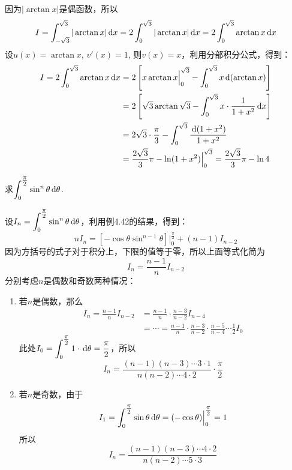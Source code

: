 \begin{solution}
因为$|\arctan x|$是偶函数，所以
\[I=\displaystyle\int^{\sqrt{3}}_{-\sqrt{3}}|\arctan x|\,{\rm d} x=2\displaystyle\int^{\sqrt{3}}_{0}|\arctan x|\,{\rm d} x=2\displaystyle\int^{\sqrt{3}}_{0}\arctan x\,{\rm d} x\]
设$u(x)=\arctan x$, $v'(x)=1$, 则$v(x)=x$，利用分部积分公式，得到：
\[\begin{split}
    I=2\displaystyle\int^{\sqrt{3}}_{0}\arctan x\,{\rm d} x &=2\left[x\arctan x\Big|^{\sqrt{3}}_0-\int^{\sqrt{3}}_0 x\,{\rm d} (\arctan x)\right]\\
    &=2\left[\sqrt{3}\arctan\sqrt{3}-\int^{\sqrt{3}}_0 x\cdot \dfrac{1}{1+x^2}\,{\rm d} x \right]\\
    &=2\sqrt{3}\cdot \dfrac{\pi}{3}-\int^{\sqrt{3}}_0 \dfrac{\,{\rm d}(1+x^2)}{1+x^2}\\
    &=\dfrac{2\sqrt{3}}{3}\pi -\ln(1+x^2)\Big|^{\sqrt{3}}_0= \dfrac{2\sqrt{3}}{3}\pi -\ln 4
\end{split}\]
\end{solution}


\begin{example}
    求$\displaystyle\int^{\tfrac{\pi}{2}}_0 \sin^n \theta\,{\rm d} \theta$.
\end{example}

\begin{solution}
    设$I_n=\displaystyle\int^{\tfrac{\pi}{2}}_0 \sin^n \theta\,{\rm d} \theta$，利用例4.42的结果，得到：
\[nI_n=\left[-\cos\theta\sin^{n-1}\theta\right]\Big|^{\tfrac{\pi}{2}}_0 +(n-1)I_{n-2}\]
因为方括号的式子对于积分上，下限的值等于零，所以上面等式化简为
\[I_n=\frac{n-1}{n}I_{n-2}\]
分别考虑$n$是偶数和奇数两种情况：
\begin{enumerate}
    \item 若$n$是偶数，那么
\[\begin{split}
    I_n=\frac{n-1}{n}I_{n-2}&=\frac{n-1}{n}\cdot \frac{n-3}{n-2}I_{n-4}\\
    &=\cdots=\frac{n-1}{n}\cdot \frac{n-3}{n-2}\cdot \frac{n-5}{n-4}\cdots \frac{1}{2}I_{0}
\end{split}
    \]
此处$I_0=\displaystyle\int^{\tfrac{\pi}{2}}_0 1\cdot \,{\rm d} \theta=\dfrac{\pi}{2}$，所以
\[I_n=\frac{(n-1)(n-3)\cdots 3\cdot 1}{n(n-2)\cdots 4\cdot 2}\cdot \frac{\pi}{2}\]

\item 若$n$是奇数，由于
\[I_1=\displaystyle\int^{\tfrac{\pi}{2}}_0 \sin\theta\,{\rm d}\theta =(-\cos\theta)\Big|^{\tfrac{\pi}{2}}_0=1\]
所以
\[I_n=\frac{(n-1)(n-3)\cdots 4\cdot 2}{n(n-2)\cdots 5\cdot 3}\]
\end{enumerate}
\end{solution}

